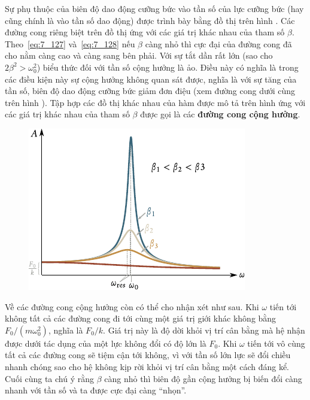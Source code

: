 Sự phụ thuộc của biên độ dao động cưỡng bức vào tần số của lực cưỡng bức (hay cũng chính là vào tần số dao động) được trình bày bằng đồ thị trên hình . Các đường cong riêng biệt trên đồ thị ứng với các giá trị khác nhau của tham số $\beta$. Theo~\eqref{eq:7_127} và~\eqref{eq:7_128} nếu $\beta$ càng nhỏ thì cực đại của đường cong đã cho nằm càng cao và càng sang bên phải. Với sự tắt dần rất lớn (sao cho $2\beta^2>\omega_0^2$) biểu thức đối với tần số cộng hưởng là ảo. Điều này có nghĩa là trong các điều kiện này sự cộng hưởng không quan sát được, nghĩa là với sự tăng của tần số, biên độ dao động cưỡng bức giảm đơn điệu (xem đường cong dưới cùng trên hình ). Tập hợp các đồ thị khác nhau của hàm  được mô tả trên hình  ứng với các giá trị khác nhau của tham số $\beta$ được gọi là các \textbf{đường cong cộng hưởng}.

\begin{figure}[!htb]
	\begin{center}
		\includegraphics[scale=0.95]{figures/ch_07/fig_7_24.pdf}
		\caption[]{}
		\label{fig:7_24}
	\end{center}
\end{figure}

Về các đường cong cộng hưởng còn có thể cho nhận xét như sau. Khi $\omega$ tiến tới không tất cả các đường cong đi tới cùng một giá trị giới khác không bằng $F_0/(m\omega_0^2)$, nghĩa là $F_0/k$. Giá trị này là độ dời khỏi vị trí cân bằng mà hệ nhận được dưới tác dụng của một lực không đổi có độ lớn là $F_0$. Khi $\omega$ tiến tới vô cùng tất cả các đường cong sẽ tiệm cận tới không, vì với tần số lớn lực sẽ đổi chiều nhanh chóng sao cho hệ không kịp rời khỏi vị trí cân bằng một cách đáng kể. Cuối cùng ta chú ý rằng $\beta$ càng nhỏ thì biên độ gần cộng hưởng bị biến đổi càng nhanh với tần số và ta được cực đại càng ``nhọn''.

